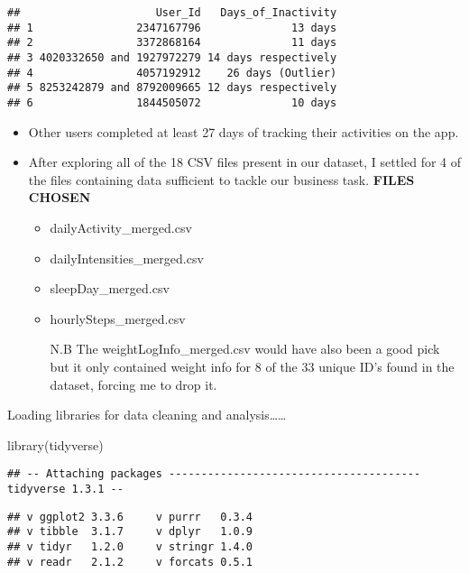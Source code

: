 \documentclass[
]{article}
\newenvironment{Shaded}{\begin{snugshade}}{\end{snugshade}}
\newcommand{\FunctionTok}[1]{\textcolor[rgb]{0.00,0.00,0.00}{#1}}
\newcommand{\NormalTok}[1]{#1}
\providecommand{\tightlist}{%
  \setlength{\itemsep}{0pt}\setlength{\parskip}{0pt}}
\begin{document}
\begin{verbatim}
##                     User_Id   Days_of_Inactivity
## 1                2347167796              13 days
## 2                3372868164              11 days
## 3 4020332650 and 1927972279 14 days respectively
## 4                4057192912    26 days (Outlier)
## 5 8253242879 and 8792009665 12 days respectively
## 6                1844505072              10 days
\end{verbatim}

\begin{itemize}
\tightlist
\item
  Other users completed at least 27 days of tracking their activities on
  the app.
\item
  After exploring all of the 18 CSV files present in our dataset, I
  settled for 4 of the files containing data sufficient to tackle our
  business task. \textbf{FILES CHOSEN}

  \begin{itemize}
  \item
    dailyActivity\_merged.csv
  \item
    dailyIntensities\_merged.csv
  \item
    sleepDay\_merged.csv
  \item
    hourlySteps\_merged.csv

    N.B The weightLogInfo\_merged.csv would have also been a good pick
    but it only contained weight info for 8 of the 33 unique ID's found
    in the dataset, forcing me to drop it.
  \end{itemize}
\end{itemize}

Loading libraries for data cleaning and analysis\ldots\ldots{}

\begin{Shaded}
\begin{Highlighting}[]
\FunctionTok{library}\NormalTok{(tidyverse)}
\end{Highlighting}
\end{Shaded}

\begin{verbatim}
## -- Attaching packages --------------------------------------- tidyverse 1.3.1 --
\end{verbatim}

\begin{verbatim}
## v ggplot2 3.3.6     v purrr   0.3.4
## v tibble  3.1.7     v dplyr   1.0.9
## v tidyr   1.2.0     v stringr 1.4.0
## v readr   2.1.2     v forcats 0.5.1
\end{verbatim}
\end{document}
